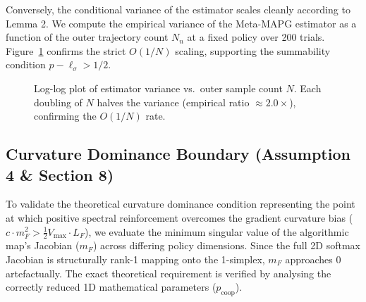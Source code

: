 \documentclass[11pt,a4paper]{article}
\theoremstyle{remark}
\begin{document}
Conversely, the conditional variance of the estimator scales cleanly according to Lemma 2. We compute the empirical variance of the Meta-MAPG estimator as a function of the outer trajectory count $N_n$ at a fixed policy over 200 trials. Figure~\ref{fig:variance} confirms the strict $O(1/N)$ scaling, supporting the summability condition $p - \ell_\sigma > 1/2$.

\begin{figure}[H]
\centering
{}
\caption{%
  Log-log plot of estimator variance vs.\ outer sample count $N$.
  Each doubling of $N$ halves the variance (empirical ratio
  $\approx 2.0\times$), confirming the $O(1/N)$ rate.
}
\label{fig:variance}
\end{figure}

\subsection{Curvature Dominance Boundary (Assumption 4 \& Section 8)}
\label{sec:assumption_5}

To validate the theoretical curvature dominance condition representing the point at which positive spectral reinforcement overcomes the gradient curvature bias ($c \cdot m_F^2 > \frac{1}{2} V_{\max} \cdot L_F$), we evaluate the minimum singular value of the algorithmic map's Jacobian ($m_F$) across differing policy dimensions. Since the full 2D softmax Jacobian is structurally rank-1 mapping onto the 1-simplex, $m_F$ approaches $0$ artefactually. The exact theoretical requirement is verified by analysing the correctly reduced 1D mathematical parameters ($p_{\mathrm{coop}}$).
\end{document}
